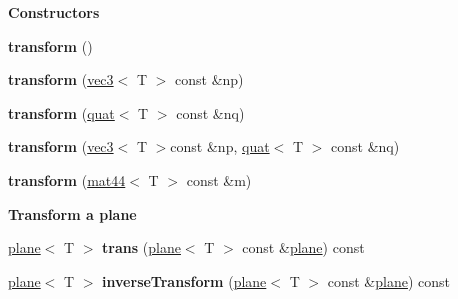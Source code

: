\begin{Indent}{\bf Constructors}\par
{\em \label{_amgrp559a25fdb98a7d1fd1c3771ac568d5e9}
 }\begin{DoxyCompactItemize}
\item 
\hypertarget{classmath_1_1transform_aac5c96a861fd0efa2f59b934aa18209b}{
{\bfseries transform} ()}
\label{classmath_1_1transform_aac5c96a861fd0efa2f59b934aa18209b}

\item 
\hypertarget{classmath_1_1transform_aecf7886adfe7f3a7106cd447fea3e185}{
{\bfseries transform} (\hyperlink{classmath_1_1vec3}{vec3}$<$ T $>$ const \&np)}
\label{classmath_1_1transform_aecf7886adfe7f3a7106cd447fea3e185}

\item 
\hypertarget{classmath_1_1transform_ae93a4f522574b2b1e7445aa3f6098a9e}{
{\bfseries transform} (\hyperlink{classmath_1_1quat}{quat}$<$ T $>$ const \&nq)}
\label{classmath_1_1transform_ae93a4f522574b2b1e7445aa3f6098a9e}

\item 
\hypertarget{classmath_1_1transform_af6b5742b9215436c87770a970456265a}{
{\bfseries transform} (\hyperlink{classmath_1_1vec3}{vec3}$<$ T $>$const \&np, \hyperlink{classmath_1_1quat}{quat}$<$ T $>$ const \&nq)}
\label{classmath_1_1transform_af6b5742b9215436c87770a970456265a}

\item 
\hypertarget{classmath_1_1transform_a78c9a25db2506ca71a89c2890733fa0f}{
{\bfseries transform} (\hyperlink{classmath_1_1mat44}{mat44}$<$ T $>$ const \&m)}
\label{classmath_1_1transform_a78c9a25db2506ca71a89c2890733fa0f}

\end{DoxyCompactItemize}
\end{Indent}
\begin{Indent}{\bf Transform a plane}\par
{\em \label{_amgrpdc1393e28eaae76d432e4ffaaf7ffa71}
 }\begin{DoxyCompactItemize}
\item 
\hypertarget{classmath_1_1transform_a79bb602970c32092152088b93303d138}{
\hyperlink{classmath_1_1plane}{plane}$<$ T $>$ {\bfseries trans} (\hyperlink{classmath_1_1plane}{plane}$<$ T $>$ const \&\hyperlink{classmath_1_1plane}{plane}) const }
\label{classmath_1_1transform_a79bb602970c32092152088b93303d138}

\item 
\hypertarget{classmath_1_1transform_a178583d13a388661b0d67a1f9a2ac00d}{
\hyperlink{classmath_1_1plane}{plane}$<$ T $>$ {\bfseries inverseTransform} (\hyperlink{classmath_1_1plane}{plane}$<$ T $>$ const \&\hyperlink{classmath_1_1plane}{plane}) const }
\label{classmath_1_1transform_a178583d13a388661b0d67a1f9a2ac00d}

\end{DoxyCompactItemize}
\end{Indent}
